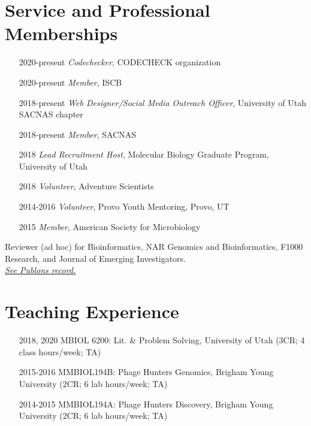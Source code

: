 \documentclass[margin,line]{res}
\begin{document}
\begin{resume}
\section{\sc Service and Professional Memberships}
\begin{itemize}[style=multiline,leftmargin=2.2cm,font=\normalfont]
\item[2020-present] \textit{Codechecker}, CODECHECK organization
\item[2020-present] \textit{Member}, ISCB
\item[2018-present] \textit{Web Designer/Social Media Outreach Officer}, University of Utah SACNAS chapter
\item[2018-present] \textit{Member}, SACNAS
\item[2018] \textit{Lead Recruitment Host}, Molecular Biology Graduate Program, University of Utah
\item[2018] \textit{Volunteer}, Adventure Scientists
\item[2014-2016] \textit{Volunteer}, Provo Youth Mentoring, Provo, UT
\item[2015] \textit{Member}, American Society for Microbiology
\end{itemize}

Reviewer (ad hoc) for Bioinformatics, NAR Genomics and Bioinformatics, F1000 Research, and Journal of Emerging Investigators. \\
\hspace*{12pt} \href{https://bit.ly/2DLqcsk}{\textit{See Publons record.}}


\section{\sc Teaching Experience}
\begin{itemize}[style=multiline,leftmargin=2.2cm,font=\normalfont]
\item[2018, 2020] MBIOL 6200: Lit. \& Problem Solving, University of Utah (3CR; 4 class hours/week; TA)
\item[2015-2016] MMBIOL194B: Phage Hunters Genomics, Brigham Young University (2CR; 6 lab hours/week; TA)
\item[2014-2015] MMBIOL194A: Phage Hunters Discovery, Brigham Young University (2CR; 6 lab hours/week; TA)
\end{itemize}



\end{resume}
\end{document}
